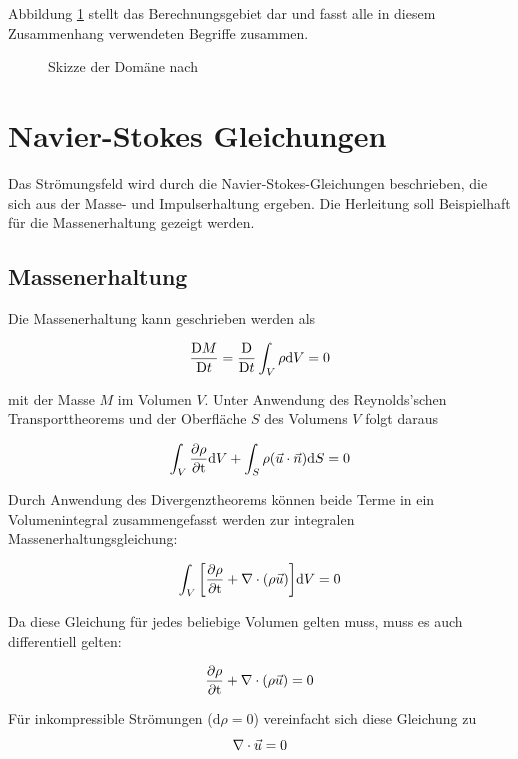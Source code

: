 Abbildung \ref{fig:domain} stellt das Berechnungsgebiet dar und fasst alle in diesem Zusammenhang verwendeten  Begriffe zusammen.
\begin{figure}[htp]
 \centering
 \def\svgwidth{0.7\textwidth}
 
\caption{Skizze der Domäne nach \cite{Fries}}
\label{fig:domain}
\end{figure} 

\section{Navier-Stokes Gleichungen}
Das Strömungsfeld wird durch die Navier-Stokes-Gleichungen beschrieben, die sich aus der Masse- und Impulserhaltung ergeben. Die Herleitung soll Beispielhaft für die Massenerhaltung gezeigt werden.\\

\subsection{Massenerhaltung}

Die Massenerhaltung kann geschrieben werden als

\begin{equation}
   \frac{\mathrm{D} M}{\mathrm{D} t} =  \frac{\mathrm{D}}{\mathrm{D} t} \int_V \rho \mathrm{d} V = 0
\end{equation}

mit der Masse $M$ im Volumen $V$. Unter Anwendung des Reynolds'schen Transporttheorems und der Oberfläche $S$ des Volumens $V$ folgt daraus

\begin{equation}
    \int_V \frac{\partial \rho}{\partial \mathrm{t}} \mathrm{d} V + \int_S\rho(\vec{u} \cdot \vec{n})\mathrm{d} S = 0
\end{equation}

Durch Anwendung des Divergenztheorems können beide Terme in ein Volumenintegral zusammengefasst werden zur integralen Massenerhaltungsgleichung:

\begin{equation}
	\int_V\bigg[\frac{\partial \rho}{\partial \mathrm{t}} + \nabla \cdot (\rho\vec{u})\bigg] \mathrm{d} V =0
\end{equation}

Da diese Gleichung für jedes beliebige Volumen gelten muss, muss es auch
differentiell gelten:

\begin{equation}
	\frac{\partial \rho}{\partial \mathrm{t}} + \nabla \cdot (\rho\vec{u}) = 0
\end{equation}

Für inkompressible Strömungen (\(\mathrm{d}\rho = 0\)) vereinfacht sich diese Gleichung zu
\begin{equation}
	\nabla\cdot\vec{u} =0
\end{equation}


